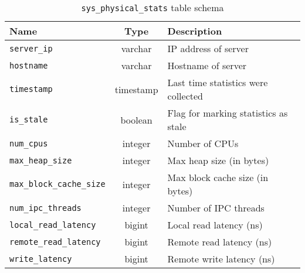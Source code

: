 \begin{table}
				\begin{tabular}{|l|c|p{6cm}|}
								\hline
								\bf{Name}													& \bf{Type}	&	\bf{Description} \\ \hline	
								\texttt{server\_ip}								&	varchar		&	IP address of server \\ \hline
								\texttt{hostname}									&	varchar		&	Hostname of server \\ \hline
								\texttt{timestamp}								&	timestamp	&	Last time statistics were collected \\ \hline
								\texttt{is\_stale}								&	boolean		&	Flag for marking statistics as stale \\ \hline
								\texttt{num\_cpus}								&	integer		& Number of CPUs \\ \hline
								\texttt{max\_heap\_size}					&	integer		&	Max heap size (in bytes)\\ \hline
								\texttt{max\_block\_cache\_size}	&	integer		&	Max block cache size (in bytes) \\ \hline
								\texttt{num\_ipc\_threads}				&	integer		&	Number of IPC threads \\ \hline
								\texttt{local\_read\_latency}			&	bigint		&	Local read latency (ns) \\ \hline
								\texttt{remote\_read\_latency}		&	bigint		& Remote read latency (ns) \\ \hline
								\texttt{write\_latency}						&	bigint		&	Remote write latency (ns) \\ \hline
				\end{tabular}
				\caption{\texttt{sys\_physical\_stats} table schema}
				\label{table:physicalStats}
\end{table}

